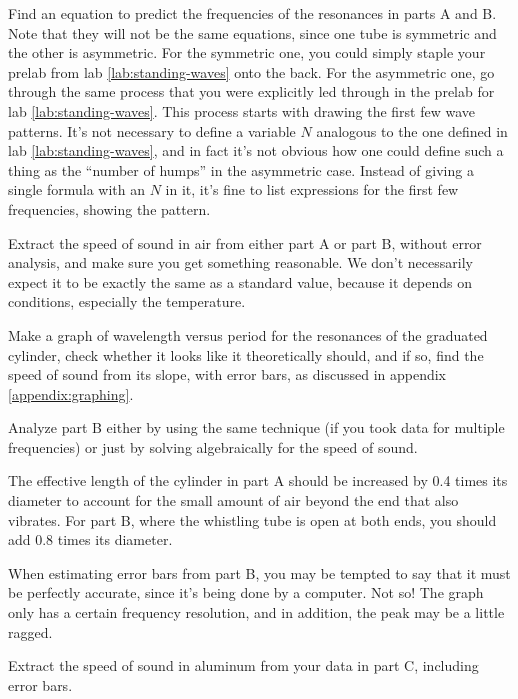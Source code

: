 \prelab

\prelabquestion   Find an equation to predict the frequencies of the
resonances in parts A and B. Note that they will not be
the same equations, since one tube is symmetric and the
other is asymmetric. For the symmetric one, you could simply staple your prelab from 
lab \ref{lab:standing-waves} onto the back. For the asymmetric one, go through the same
process that you were explicitly led through in the prelab for lab \ref{lab:standing-waves}.
This process starts with drawing the first few wave patterns. It's not necessary to define a
variable $N$ analogous to the one defined in lab \ref{lab:standing-waves}, and in fact it's
not obvious how one could define such a thing as the ``number of humps'' in the asymmetric case.
Instead of giving a single formula with an $N$ in it, it's fine to list expressions for the
first few frequencies, showing the pattern.

\selfcheck

Extract the speed of sound in air from either part A or part B,
without error analysis, and make sure you get something
reasonable. We don't necessarily expect it to be exactly the same as
a standard value, because it depends on conditions, especially the temperature.

\analysis

Make a graph of wavelength versus period for the resonances
of the graduated cylinder, check whether it looks like it
theoretically should, and if so, find the speed of sound
from its slope, with error bars, as discussed in appendix
\ref{appendix:graphing}.

Analyze part B either by using the same technique (if you
took data for multiple frequencies) or just by solving algebraically for
the speed of sound.

The effective length of the cylinder in part A should be
increased by 0.4 times its diameter to account for the small
amount of air beyond the end that also vibrates.  For part
B, where the whistling tube is open at both ends, you
should add 0.8 times its diameter.

When estimating error bars from part B, you may be tempted
to say that it must be perfectly accurate, since it's being
done by a computer.  Not so!  The graph only has a certain frequency
resolution, and in addition, the peak may be
a little ragged.

Extract the speed of sound in aluminum from your data in
part C, including error bars.
